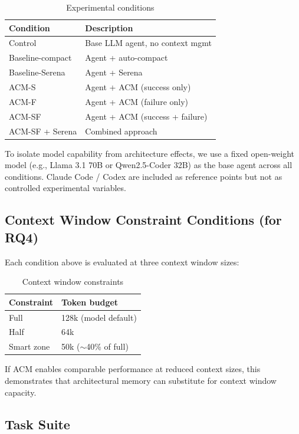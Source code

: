 \documentclass[conference]{IEEEtran}
\begin{document}
\begin{table}[h]
\centering
\caption{Experimental conditions}
\label{tab:conditions}
\small
\begin{tabular}{ll}
\toprule
\textbf{Condition} & \textbf{Description} \\
\midrule
Control & Base LLM agent, no context mgmt \\
Baseline-compact & Agent + auto-compact \\
Baseline-Serena & Agent + Serena \\
ACM-S & Agent + ACM (success only) \\
ACM-F & Agent + ACM (failure only) \\
ACM-SF & Agent + ACM (success + failure) \\
ACM-SF + Serena & Combined approach \\
\bottomrule
\end{tabular}
\end{table}

To isolate model capability from architecture effects, we use a fixed open-weight model (e.g., Llama 3.1 70B or Qwen2.5-Coder 32B) as the base agent across all conditions. Claude Code / Codex are included as reference points but not as controlled experimental variables.

\subsection{Context Window Constraint Conditions (for RQ4)}

Each condition above is evaluated at three context window sizes:

\begin{table}[h]
\centering
\caption{Context window constraints}
\label{tab:constraints}
\small
\begin{tabular}{ll}
\toprule
\textbf{Constraint} & \textbf{Token budget} \\
\midrule
Full & 128k (model default) \\
Half & 64k \\
Smart zone & 50k ($\sim$40\% of full) \\
\bottomrule
\end{tabular}
\end{table}

If ACM enables comparable performance at reduced context sizes, this demonstrates that architectural memory can substitute for context window capacity.

\subsection{Task Suite}
\end{document}
